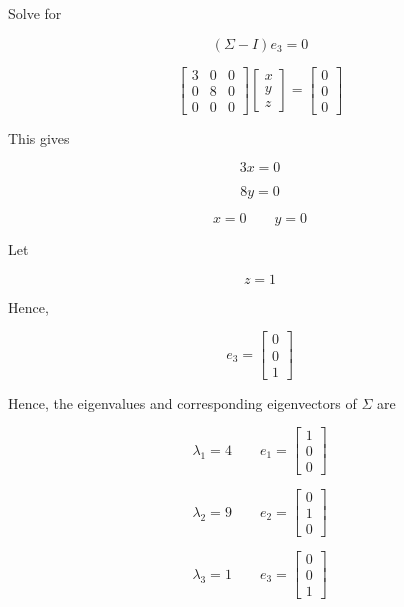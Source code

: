 \documentclass[12pt]{article}
\begin{document}
\vspace{0.3cm}

\noindent
Solve for

\[
(\Sigma-I)e_3=0
\]

\[
\begin{bmatrix}
3 & 0 & 0\\
0 & 8 & 0\\
0 & 0 & 0
\end{bmatrix}
\begin{bmatrix}
x\\
y\\
z
\end{bmatrix}
=
\begin{bmatrix}
0\\
0\\
0
\end{bmatrix}
\]

\noindent
This gives

\[
3x=0
\]

\[
8y=0
\]

\[
x=0
\qquad
y=0
\]

\noindent
Let

\[
z=1
\]

\noindent
Hence,

\[
\boxed{
e_3=
\begin{bmatrix}
0\\
0\\
1
\end{bmatrix}
}
\]

\vspace{0.5cm}

\noindent
Hence, the eigenvalues and corresponding eigenvectors of \(\Sigma\) are

\[
\boxed{
\lambda_1=4
\qquad
e_1=
\begin{bmatrix}
1\\
0\\
0
\end{bmatrix}
}
\]

\[
\boxed{
\lambda_2=9
\qquad
e_2=
\begin{bmatrix}
0\\
1\\
0
\end{bmatrix}
}
\]

\[
\boxed{
\lambda_3=1
\qquad
e_3=
\begin{bmatrix}
0\\
0\\
1
\end{bmatrix}
}
\]
\end{document}

